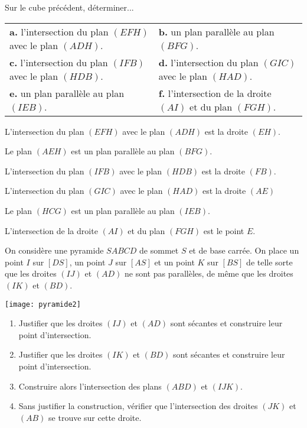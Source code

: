 \documentclass[11pt,fleqn, openany]{book} %
\begin{document}
\begin{exercise}Sur le cube précédent, déterminer...

\begin{tabularx}{\linewidth}{XX}
\textbf{a.} l'intersection du plan $(EFH)$ avec le plan $(ADH)$. &  \textbf{b.} un plan parallèle au plan $(BFG)$. \\
\textbf{c.} l'intersection du plan $(IFB)$ avec le plan $(HDB)$. & \textbf{d.} l'intersection du plan $(GIC)$ avec le plan $(HAD)$. \\
\textbf{e.} un plan parallèle au plan $(IEB)$. & \textbf{f.}  l'intersection de la droite $(AI)$ et du plan $(FGH)$.
\end{tabularx}\end{exercise}

\begin{solution}L'intersection du plan $(EFH)$ avec le plan $(ADH)$ est la droite $(EH)$.

Le plan $(AEH)$ est un plan parallèle au plan $(BFG)$.

L'intersection du plan $(IFB)$ avec le plan $(HDB)$ est la droite $(FB)$.

L'intersection du plan $(GIC)$ avec le plan $(HAD)$ est la droite $(AE)$

Le plan $(HCG)$ est un plan parallèle au plan $(IEB)$.

L'intersection de la droite $(AI)$ et du plan $(FGH)$ est le point $E$.

\end{solution}


\begin{exercise}\hspace{0pt}
  \begin{minipage}{0.5 \linewidth}
On considère une pyramide $SABCD$ de sommet $S$ et de base carrée. On place un point $I$ sur $[DS]$, un point $J$ sur $[AS]$ et un point $K$ sur $[BS]$ de telle sorte que les droites $(IJ)$ et $(AD)$ ne sont pas parallèles, de même que les droites $(IK)$ et $(BD)$.

\end{minipage}\hfill \begin{minipage}{0.4\linewidth}
\texttt{[image: pyramide2]}

\end{minipage}
\vskip30pt
\begin{enumerate}
\item Justifier que les droites $(IJ)$ et $(AD)$ sont sécantes et construire leur point d'intersection.
\item Justifier que les droites $(IK)$ et $(BD)$ sont sécantes et construire leur point d'intersection.
\item Construire alors l'intersection des plans $(ABD)$ et $(IJK)$.
\item Sans justifier la construction, vérifier que l'intersection des droites $(JK)$ et $(AB)$ se trouve sur cette droite.
\end{enumerate}
\end{exercise}
\end{document}
